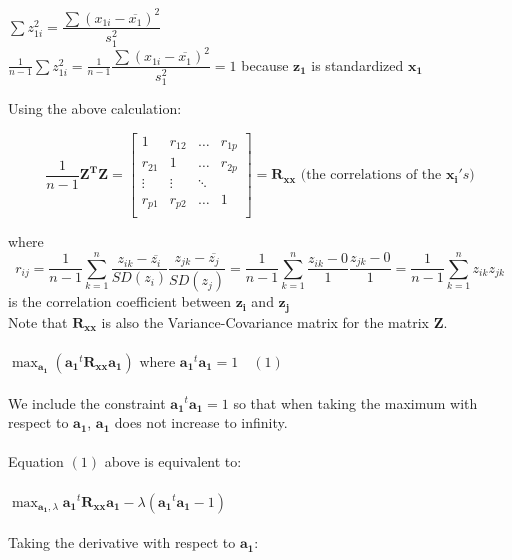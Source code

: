 \documentclass{article}
\begin{document}
\begin{enumerate}
$\sum z_{1i}^2 = \dfrac{\sum (x_{1i} - \overline{x_1})^2}{s_1^2}$ \\

$\frac{1}{n-1}\sum z_{1i}^2 = \frac{1}{n-1}\dfrac{\sum (x_{1i} - \overline{x_1})^2}{s_1^2} = 1$ because $\boldsymbol{z_1}$ is standardized $\boldsymbol{x_1}$

Using the above calculation:

$$
\frac{1}{n-1}\boldsymbol{Z^T}\boldsymbol{Z} = 
\begin{bmatrix}
1 & r_{12} & \ldots & r_{1p}\\
r_{21} & 1 & \ldots & r_{2p}\\
\vdots & \vdots & \ddots \\
r_{p1} & r_{p2} & \ldots & 1 \\
\end{bmatrix} = \boldsymbol{R_{xx}} \text{ (the correlations of the $\boldsymbol{x_i}'s$)}
$$

where $$r_{ij} = \frac{1}{n-1}\sum_{k=1}^n \frac{z_{ik} - \overline{z_i}}{SD(z_i)}\frac{z_{jk} - \overline{z_j}}{SD(z_j)} = \frac{1}{n-1}\sum_{k=1}^n \frac{z_{ik} - 0}{1}\frac{z_{jk} - 0}{1} = \frac{1}{n-1}\sum_{k=1}^n z_{ik}z_{jk}$$ is the correlation coefficient between $\boldsymbol{z_i}$ and $\boldsymbol{z_j}$\\

\noindent Note that $\boldsymbol{R_{xx}}$ is also the Variance-Covariance matrix for the matrix $\boldsymbol{Z}$.
\\\\
$
\max_{\boldsymbol{a_1}} (\boldsymbol{a_1}^t\boldsymbol{R_{xx}}\boldsymbol{a_1}) \text{ where } \boldsymbol{a_1}^t\boldsymbol{a_1} = 1 \quad (1)
$
\\\\
\noindent We include the constraint $\boldsymbol{a_1}^t\boldsymbol{a_1} = 1$ so that when taking the maximum with respect to $\boldsymbol{a_1}$, $\boldsymbol{a_1}$ does not increase to infinity.\\\\

\noindent Equation $(1)$ above is equivalent to:\\\\

$\max_{\boldsymbol{a_1}, \lambda} \boldsymbol{a_1}^t\boldsymbol{R_{xx}}\boldsymbol{a_1} - \lambda(\boldsymbol{a_1}^t\boldsymbol{a_1} - 1)$\\\\

\noindent Taking the derivative with respect to $\boldsymbol{a_1}$:\\\\


\end{enumerate}
\end{document}
